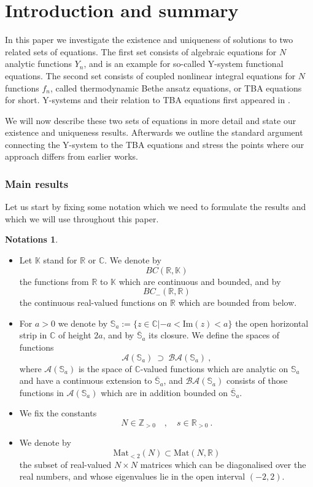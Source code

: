 \documentclass[12pt]{article}
\theoremstyle{plain}
\theoremstyle{definition}
\newtheorem{notation}[theorem]{Notations}
\numberwithin{equation}{section}
\numberwithin{theorem}{section}
\begin{document}
\section{Introduction and summary}

In this paper we investigate the existence and uniqueness of solutions to two related sets of equations. The first set consists of algebraic equations for $N$ analytic functions $Y_n$, and is an example for so-called Y-system functional equations. The second set consists of coupled
nonlinear integral equations for $N$ functions $f_n$, called thermodynamic Bethe ansatz equations, or TBA equations for short.
Y-systems and their relation to 
	TBA equations 
first appeared in \cite{Zamo:ADE}.

We will now describe these two sets of equations in more detail and  state our existence and uniqueness results. 
Afterwards we outline the standard argument connecting the Y-system to the TBA equations and stress the points where our approach differs from earlier works.

\subsubsection*{Main results}

Let us start by fixing some notation which we need to formulate the results and which we will use throughout this paper.

\begin{notation}\label{intro-notation}~
\begin{itemize}[leftmargin=1em]
\item Let $\mathbb{K}$ stand for $\mathbb{R}$ or $\mathbb{C}$. 
We denote by \[BC(\mathbb{R},\mathbb{K})\] the functions from $\mathbb{R}$ to $\mathbb{K}$ which are continuous and bounded, and by
$$
	BC_-(\mathbb{R},\mathbb{R})  
$$
the continuous real-valued functions on $\mathbb{R}$ which are bounded from below.
\item For $a>0$ we denote by $\mathbb{S}_a := \lbrace z\in\mathbb{C} | -a<\mathrm{Im}(z)<a\rbrace$ the open horizontal strip in $\mathbb{C}$ of height $2a$, and by $\overline{\mathbb{S}}_a$ its closure.
We define the spaces of functions
$$
	\mathcal{A}(\mathbb{S}_a) ~\supset~ \mathcal{BA}(\mathbb{S}_a) \ ,
$$
where $\mathcal{A}(\mathbb{S}_a)$ is the space of $\mathbb{C}$-valued functions which are analytic on $\mathbb{S}_a$ and have a continuous extension to 
	$\overline{\mathbb{S}}_a$, 
and $\mathcal{BA}(\mathbb{S}_a)$ consists of 
	those functions in $\mathcal{A}(\mathbb{S}_a)$
which are in addition bounded on 
	$\overline{\mathbb{S}}_a$.
\item
We fix the constants
$$
	N \in \mathbb{Z}_{>0}
	\quad ,
	\quad
	s \in \mathbb{R}_{>0} \ .
$$
\item We denote by 
$$
	\mathrm{Mat}_{<2}(N) \subset \mathrm{Mat}(N,\mathbb{R})
$$	
the subset of real-valued $N\times N$
matrices which can be diagonalised over the real numbers, and whose eigenvalues lie in the open interval $(-2,2)$.
\end{itemize}
\end{notation}
\end{document}
